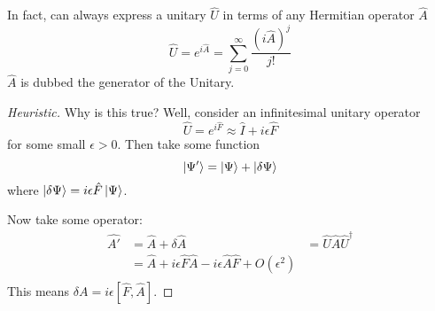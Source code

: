 \begin{theorem}
    In fact, can always express a unitary $\hat{U}$ in terms of any Hermitian operator $\hat{A}$
    \[ \hat{U} = e^{i\hat{A}} = \sum_{j = 0}^{\infty} \frac{(i\hat{A})^j}{j!}\]
    $\hat{A}$ is dubbed the generator of the Unitary.
    \begin{proof}[Heuristic]
        Why is this true? Well, consider an infinitesimal unitary operator
    \[ \hat{U} = e^{i\hat{F}} \approx \hat{I} + i \epsilon \hat{F} \]
    for some small $\epsilon > 0$. Then take some function
    \[ \ket{\Psi'} = \ket{\Psi} + \ket{\delta \Psi} \]
    where $\ket{\delta \Psi} = i \epsilon \hat{F} \ket{\Psi}$.

    Now take some operator:
    \begin{align*}
        \hat{A'} &= \hat{A} + \delta\hat{A}
        &= \hat{U} \hat{A} \hat{U}^{\dagger} \\
        &= \hat{A} + i \epsilon \hat{F}\hat{A} - i \epsilon \hat{A}\hat{F} + O(\epsilon^2) \\
    \end{align*}
    This means $\delta A = i \epsilon [\hat{F}, \hat{A}]$.
    \end{proof}
\end{theorem}
